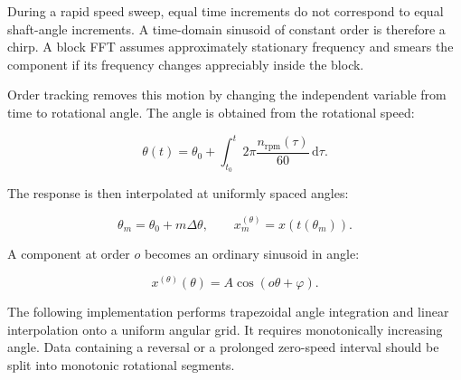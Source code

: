 During a rapid speed sweep, equal time increments do not correspond to equal
shaft-angle increments. A time-domain sinusoid of constant order is therefore a
chirp. A block FFT assumes approximately stationary frequency and smears the
component if its frequency changes appreciably inside the block.

Order tracking removes this motion by changing the independent variable from
time to rotational angle. The angle is obtained from the rotational speed:

\begin{equation}\label{angle-from-speed-integral}
    \theta(t)
    = \theta_0
    + \int_{t_0}^{t}
      2\pi\frac{n_{\mathrm{rpm}}(\tau)}{60}
      \,\mathrm{d}\tau.
\end{equation}

The response is then interpolated at uniformly spaced angles:

\begin{equation}
    \theta_m=\theta_0+m\Delta\theta,
    \qquad
    x_m^{(\theta)}=x\left(t(\theta_m)\right).
\end{equation}

A component at order $ o $ becomes an ordinary sinusoid in angle:

\begin{equation}
    x^{(\theta)}(\theta)
    = A\cos(o\theta+\varphi).
\end{equation}

The following implementation performs trapezoidal angle integration and linear
interpolation onto a uniform angular grid. It requires monotonically increasing
angle. Data containing a reversal or a prolonged zero-speed interval should be
split into monotonic rotational segments.

